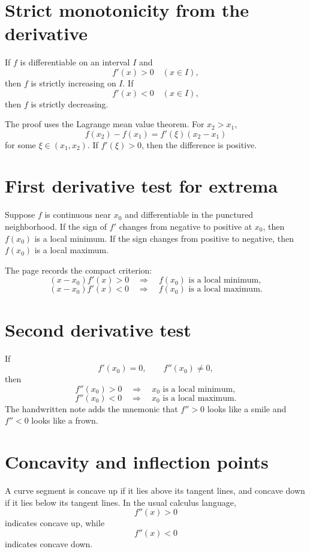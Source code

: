


\section{Strict monotonicity from the derivative}

If $f$ is differentiable on an interval $I$ and
\[
  f'(x)>0\quad(x\in I),
\]
then $f$ is strictly increasing on $I$.  If
\[
  f'(x)<0\quad(x\in I),
\]
then $f$ is strictly decreasing.

The proof uses the Lagrange mean value theorem.  For $x_2>x_1$,
\[
  f(x_2)-f(x_1)=f'(\xi)(x_2-x_1)
\]
for some $\xi\in(x_1,x_2)$.  If $f'(\xi)>0$, then the difference is positive.

\section{First derivative test for extrema}

Suppose $f$ is continuous near $x_0$ and differentiable in the punctured neighborhood.  If the sign of $f'$ changes from negative to positive at $x_0$, then $f(x_0)$ is a local minimum.  If the sign changes from positive to negative, then $f(x_0)$ is a local maximum.

The page records the compact criterion:
\[
  (x-x_0)f'(x)>0
  \quad\Longrightarrow\quad
  f(x_0)\text{ is a local minimum},
\]
\[
  (x-x_0)f'(x)<0
  \quad\Longrightarrow\quad
  f(x_0)\text{ is a local maximum}.
\]

\section{Second derivative test}

If
\[
  f'(x_0)=0,\qquad f''(x_0)\ne0,
\]
then
\[
  f''(x_0)>0\quad\Longrightarrow\quad x_0\text{ is a local minimum},
\]
\[
  f''(x_0)<0\quad\Longrightarrow\quad x_0\text{ is a local maximum}.
\]
The handwritten note adds the mnemonic that $f''>0$ looks like a smile and $f''<0$ looks like a frown.

\section{Concavity and inflection points}

A curve segment is concave up if it lies above its tangent lines, and concave down if it lies below its tangent lines.  In the usual calculus language,
\[
  f''(x)>0
\]
indicates concave up, while
\[
  f''(x)<0
\]
indicates concave down.

